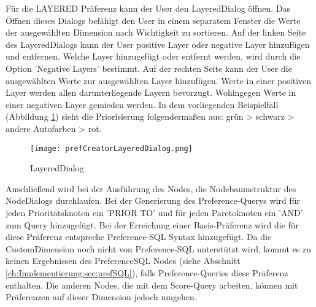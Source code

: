 Für die LAYERED Präferenz kann der User den LayeredDialog öffnen. Das Öffnen dieses Dialogs befähigt den User in einem separatem Fenster die Werte der ausgewählten Dimension nach Wichtigkeit zu sortieren.
Auf der linken Seite des LayeredDialogs kann der User positive Layer oder negative Layer hinzufügen und entfernen. Welche Layer hinzugefügt oder entfernt werden, wird durch die Option 'Negative Layers' bestimmt. Auf der rechten Seite kann der User die ausgewählten Werte zur ausgewählten Layer hinzufügen. Werte in einer positiven Layer werden allen darunterliegende Layern bevorzugt. Wohingegen Werte in einer negativen Layer gemieden werden. In dem vorliegenden Beispielfall (Abbildung \ref{img:prefCreatorLayeredDialog}) sieht die Priorisierung folgendermaßen aus: grün > schwarz > andere Autofarben > rot. 

\begin{figure}[H]
	\centering
	\texttt{[image: prefCreatorLayeredDialog.png]}
	\caption{LayeredDialog}
	\label{img:prefCreatorLayeredDialog}
\end{figure}

Anschließend wird bei der Ausführung des Nodes, die Nodebaumstruktur des NodeDialogs durchlaufen.
Bei der Generierung des Preference-Querys wird für jeden Prioritätsknoten ein 'PRIOR TO' und für jeden Paretoknoten ein 'AND' zum Query hinzugefügt. Bei der Erreichung einer Basis-Präferenz wird die für diese Präferenz entspreche Preference-SQL Syntax hinzugefügt. Da die CustomDimension noch nicht von Preference-SQL unterstützt wird, kommt es zu keinen Ergebnissen des PreferenceSQL Nodes (siehe Abschnitt \ref{ch:Implementierung:sec:prefSQL}), falls Preference-Queries diese Präferenz enthalten. Die anderen Nodes, die mit dem Score-Query arbeiten, können mit Präferenzen auf dieser Dimension jedoch umgehen. 

